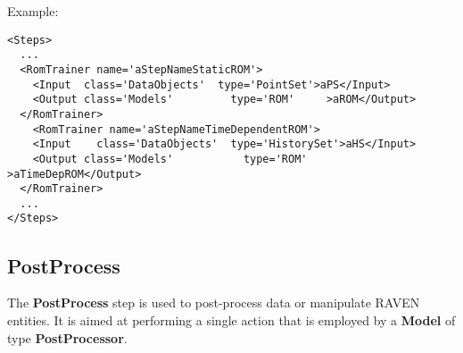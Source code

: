Example:
\begin{lstlisting}[style=XML,morekeywords={class}]
<Steps>
  ...
  <RomTrainer name='aStepNameStaticROM'>
    <Input  class='DataObjects'  type='PointSet'>aPS</Input>
    <Output class='Models'         type='ROM'     >aROM</Output>
  </RomTrainer>
    <RomTrainer name='aStepNameTimeDependentROM'>
    <Input    class='DataObjects'  type='HistorySet'>aHS</Input>
    <Output class='Models'           type='ROM'       >aTimeDepROM</Output>
  </RomTrainer>
  ...
</Steps>
\end{lstlisting}
\subsection{PostProcess}
\label{subsec:stepPostProcess}
The \textbf{PostProcess} step is used to post-process data or manipulate RAVEN
entities.
%
It is aimed at performing a single action that is employed by a
\textbf{Model} of type \textbf{PostProcessor}.
%

